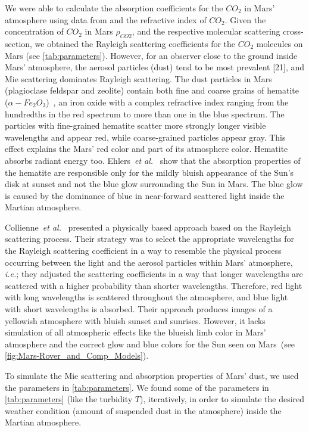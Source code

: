 \documentclass[journal]{vgtc}                %
\newcommand{\etal}{\emph{et al.}}
\newcommand{\review}[1]{{\color{blue}#1}}
\begin{document}
\review{
We were able to calculate the absorption coefficients for the $CO_2$ in Mars' atmosphere using data from \cite{Sneep:2005, Ityaksov:2008} and the refractive index of $CO_2$. 
Given the concentration of $CO_2$ in Mars $\rho_{CO2}$, and the respective molecular scattering cross-section, we obtained the Rayleigh scattering coefficients for the $CO_2$ molecules on Mars (see \autoref{tab:parameters}). However, for an observer close to the ground inside Mars' atmosphere, the aerosol particles (dust) tend to be most prevalent [21], and Mie scattering dominates Rayleigh scattering.} The dust particles in Mars (plagioclase feldspar and zeolite) \review{contain both fine and coarse grains of} hematite ($\alpha - Fe_2O_3$)~\cite{Christensen:2001}, an iron oxide with a complex refractive index ranging from the hundredths in the red spectrum to more than one in the blue spectrum. The particles with fine-grained hematite scatter more strongly longer visible wavelengths and appear red, while coarse-grained particles appear gray. This effect explains the Mars' red color and part of its atmosphere color. Hematite absorbs radiant energy too. Ehlers~\etal ~\cite{Ehlers:2014} show that the absorption properties of the hematite are responsible only for the mildly bluish appearance of the Sun's disk at sunset and not the blue glow surrounding the Sun in Mars. The blue glow is caused by the dominance of blue in near-forward scattered light inside the Martian atmosphere. 

Collienne~\etal ~\cite{Collienne:2013} presented a physically based approach based on the Rayleigh scattering process. Their strategy was to select the appropriate wavelengths for the Rayleigh scattering coefficient in a way to resemble the physical process occurring between the light and the aerosol particles within Mars' atmosphere, \textit{i.e.}; they adjusted the scattering coefficients in a way that longer wavelengths are scattered with a higher probability than shorter wavelengths. \review{Therefore, red light with long wavelengths is scattered throughout the atmosphere, and blue light with short wavelengths is absorbed.} \review{Their approach produces images of a yellowish atmosphere with bluish sunset and sunrises. However, it lacks simulation of all atmospheric effects like the blueish limb color in Mars' atmosphere and the correct glow and blue colors for the Sun seen on Mars~(see \autoref{fig:Mars-Rover_and_Comp_Models}).}

\review{
To simulate the Mie scattering and absorption properties of Mars' dust, we used the parameters in \autoref{tab:parameters}. We found some of the parameters in \autoref{tab:parameters} (like the turbidity $T$), iteratively, in order to simulate the desired weather condition (amount of suspended dust in the atmosphere) inside the Martian atmosphere.
}
\end{document}
